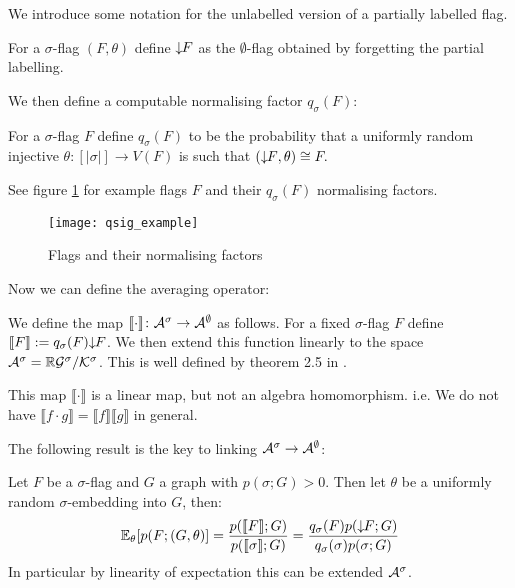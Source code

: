 We introduce some notation for the unlabelled version of a partially labelled
flag.
\begin{definition}
    For a $\sigma$-flag $(F, \theta)$ define ${\downarrow\!\!F}$ as the $\emptyset$-flag
    obtained by forgetting the partial labelling.
\end{definition}

We then define a computable normalising factor $q_\sigma(F)$:

\begin{definition}
    \label{def:averaging_normalisation}
    For a $\sigma$-flag $F$ define $q_\sigma(F)$ to be the probability that a
    uniformly random injective
    $\theta\colon [|\sigma|]\to V(F)$ is such that
    $({\downarrow\!\!F},\theta)\cong F.$
\end{definition}

See figure \ref{fig:qsig_example} for example flags $F$ and their $q_\sigma(F)$
normalising factors.

\begin{figure}[ht]
    \centering
    \texttt{[image: qsig\_example]}
    \caption{Flags and their normalising factors}
    \label{fig:qsig_example}
\end{figure}

Now we can define the averaging operator:

\begin{definition}
    \label{def:classic_averaging}
    We define the map $\llbracket \cdot \rrbracket\colon \mathcal{A}^\sigma \to \mathcal{A}^\emptyset$
    as follows. For a fixed $\sigma$-flag $F$ define
    $\llbracket F \rrbracket := q_\sigma(F) {\downarrow\!\!F}$.
    We then extend this function linearly to the space
    $\mathcal{A}^\sigma = \mathbb{R}\mathcal{G}^\sigma / \mathcal{K}^\sigma$. This is well defined by
    theorem 2.5 in \cite{razborovFlagAlgebras2007}.
\end{definition}

\begin{note}
    This map $\llbracket \cdot \rrbracket$ is a linear map, but not an algebra homomorphism.
    i.e. We do not have
    $\llbracket f\cdot g \rrbracket = \llbracket f \rrbracket \llbracket g \rrbracket$
    in general.
\end{note}

The following result is the key to linking $\mathcal{A}^\sigma \to \mathcal{A}^\emptyset$:
\begin{lemma}
    \label{lemma:classic_exp_flags}
    Let $F$ be a $\sigma$-flag and $G$ a graph with $p(\sigma; G) > 0.$ Then let
    $\theta$ be a uniformly random $\sigma$-embedding into $G$, then:
    \[
        \mathbb{E}_\theta[p(F; (G, \theta)]
        = \frac{p(\llbracket F \rrbracket; G)}{p(\llbracket \sigma \rrbracket; G)}
        = \frac{q_\sigma(F)p({\downarrow\!\!F}; G)}{q_\sigma(\sigma)p(\sigma; G)}
    \]
    In particular by linearity of expectation this can be extended
    $\mathcal{A}^\sigma$.
\end{lemma}

